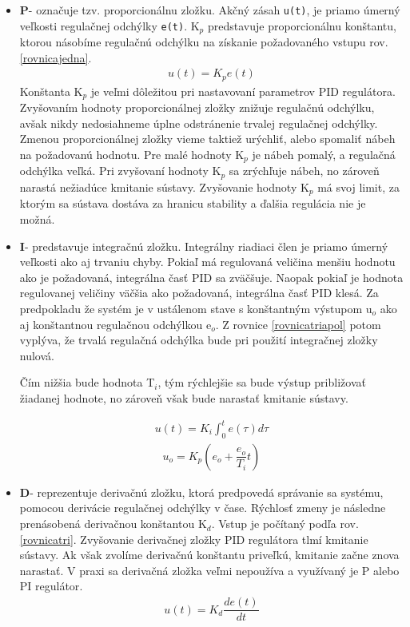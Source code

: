 \begin{itemize}
	\item \textbf{P}- označuje tzv. proporcionálnu zložku. Akčný zásah \verb|u(t)|, je priamo úmerný veľkosti regulačnej odchýlky \verb|e(t)|. K$_p$ predstavuje proporcionálnu konštantu, ktorou násobíme regulačnú odchýlku na získanie požadovaného vstupu rov.\ref{rovnicajedna}. 
	\begin{align}
		\label{rovnicajedna}
		u(t)=K_p e(t)
	\end{align}
	Konštanta K$_p$ je veľmi dôležitou pri nastavovaní parametrov PID regulátora. Zvyšovaním hodnoty proporcionálnej zložky znižuje regulačnú odchýlku, avšak nikdy nedosiahneme úplne odstránenie trvalej regulačnej odchýlky. Zmenou proporcionálnej zložky vieme taktiež urýchliť, alebo spomaliť nábeh na požadovanú hodnotu. Pre malé hodnoty K$_p$ je nábeh pomalý, a regulačná odchýlka veľká. Pri zvyšovaní hodnoty K$_p$ sa zrýchľuje nábeh, no zároveň narastá nežiadúce kmitanie sústavy. Zvyšovanie hodnoty K$_p$ má svoj limit, za ktorým sa sústava dostáva za hranicu stability a ďalšia regulácia nie je možná. 
	
	\item \textbf{I}- predstavuje integračnú zložku. Integrálny riadiaci člen je priamo úmerný veľkosti ako aj trvaniu chyby. Pokiaľ má regulovaná veličina menšiu hodnotu ako je požadovaná, integrálna časť PID sa zväčšuje. Naopak pokiaľ je hodnota regulovanej veličiny väčšia ako požadovaná, integrálna časť PID klesá. Za predpokladu že systém je v ustálenom stave s konštantným výstupom u$_o$ ako aj konštantnou regulačnou odchýlkou e$_o$. Z rovnice \ref{rovnicatriapol} potom vyplýva, že trvalá regulačná odchýlka bude pri použití integračnej zložky nulová\cite{PIDcko}. 
	
	Čím nižšia bude hodnota T$_i$, tým rýchlejšie sa bude výstup približovať žiadanej hodnote, no zároveň však bude narastať kmitanie sústavy.   
	
	\begin{align}
		\label{rovnicadva}
		u(t)=K_i  \int_{0}^{t} e(\tau)d\tau  
	\end{align}
	\begin{align}
	\label{rovnicatriapol}
	u_o = K_p \left(e_o + \dfrac{e_o}{T_i}t\right)
    \end{align}
	
	\item \textbf{D}- reprezentuje derivačnú zložku, ktorá predpovedá správanie sa systému, pomocou derivácie regulačnej odchýlky v čase. Rýchlosť zmeny je následne prenásobená derivačnou konštantou K$_d$. Vstup je počítaný podľa rov.\ref{rovnicatri}. Zvyšovanie derivačnej zložky PID regulátora tlmí kmitanie sústavy. Ak však zvolíme derivačnú konštantu priveľkú, kmitanie začne znova narastať\cite{PIDcko}. V praxi sa derivačná zložka veľmi nepoužíva a využívaný je P alebo PI regulátor\cite{1453566}. 
	\begin{align}
		\label{rovnicatri}
		u(t)=K_d  \dfrac{de(t)}{dt}
	\end{align}

\end{itemize}

